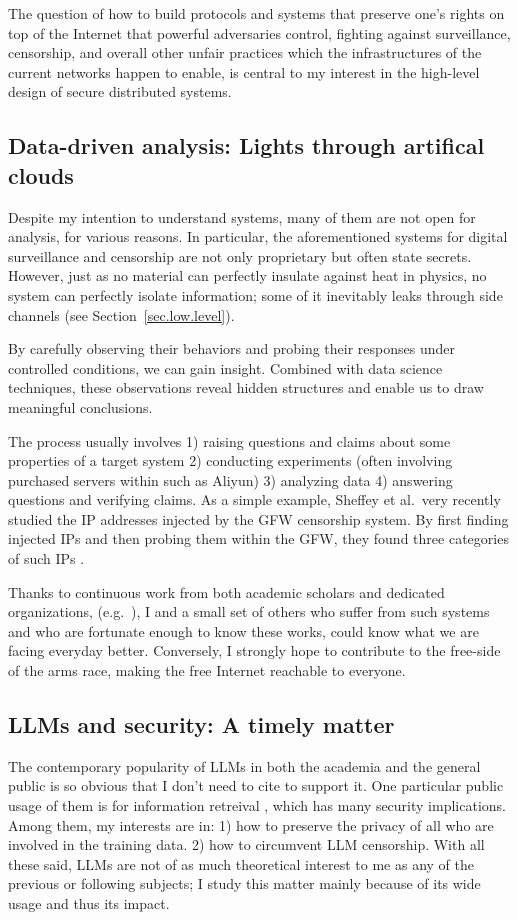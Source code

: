 \documentclass[10pt]{article}
\begin{document}
The question of how to build protocols and systems that preserve one's rights
on top of the Internet that powerful adversaries control, fighting against
surveillance, censorship, and overall other unfair practices which the
infrastructures of the current networks happen to enable, is central to my
interest in the high-level design of secure distributed systems.


\subsection[Data-driven analysis]{
Data-driven analysis: Lights through artifical clouds}
Despite my intention to understand systems, many of them are not open for
analysis, for various reasons. In particular, the aforementioned systems for
digital surveillance and censorship are not only proprietary but often state
secrets. However, just as no material can perfectly insulate against heat in
physics, no system can perfectly isolate information; some of it inevitably
leaks through side channels (see Section~\ref{sec.low.level}). 

By carefully observing their behaviors and probing their responses under
controlled conditions, we can gain insight. Combined with data science
techniques, these observations reveal hidden structures and enable us to draw
meaningful conclusions.

The process usually involves 1) raising questions and claims about some
properties of a target system 2) conducting experiments (often involving
purchased servers within such as Aliyun) 3) analyzing data 4) answering
questions and verifying claims. As a simple example, Sheffey et al.\ very
recently studied the IP addresses injected by the GFW censorship system. By
first finding injected IPs and then probing them within the GFW, they found
three categories of such IPs \cite{gfw.injected.ip}. 

Thanks to continuous work from both academic scholars and dedicated
organizations, (e.g.\ \cite{data.analysis.1, data.analysis.2, censor.block.6}),
I and a small set of others who suffer from such systems and who are fortunate
enough to know these works, could know what we are facing everyday better.
Conversely, I strongly hope to contribute to the free-side of the arms race,
making the free Internet reachable to everyone.

\subsection[LLMs and security]{LLMs and security: A timely matter}
The contemporary popularity of LLMs in both the academia and the general public
is so obvious that I don't need to cite to support it. One particular public
usage of them is for information retreival \cite{info.ret.llms.1,
info.ret.llms.2}, which has many security
implications. Among them, my interests are in: 1) how to preserve the privacy
of all who are involved in the training data. 2) how to circumvent LLM
censorship. With all these said, LLMs are not of as much theoretical interest
to me as any of the previous or following subjects; I study this matter mainly
because of its wide usage and thus its impact.
\end{document}
